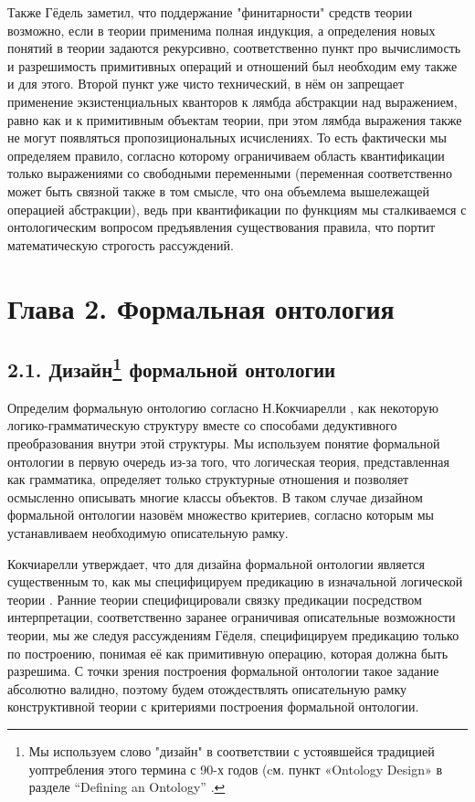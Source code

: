 \documentclass[14pt]{extarticle}
\begin{document}
	Также Гёдель заметил, что поддержание "финитарности" средств теории возможно, если в теории применима полная индукция, а определения новых понятий в теории задаются рекурсивно, соответственно пункт про вычислимость и разрешимость примитивных операций и отношений был необходим ему также и для этого. Второй пункт уже чисто технический, в нём он запрещает применение экзистенциальных кванторов к лямбда абстракции над выражением, равно как и к примитивным объектам теории, при этом лямбда выражения также не могут появляться  пропозициональных исчислениях.  То есть фактически мы определяем правило, согласно которому ограничиваем область квантификации только выражениями со свободными переменными (переменная соответственно может быть связной также в том смысле, что она объемлема вышележащей операцией абстракции), ведь при квантификации по функциям мы сталкиваемся с онтологическим вопросом предъявления существования правила, что портит математическую строгость рассуждений. 
	\newpage
	\section*{Глава 2. Формальная онтология}
	\subsection*{2.1. Дизайн\footnote{Мы используем слово "дизайн" в соответствии с устоявшейся традицией уоптребления этого термина с 90-х годов (cм. пункт «Ontology Design» в разделе “Defining an Ontology” \cite[5–7]{gruber1993translation}.} формальной онтологии}
	
	Определим формальную онтологию согласно Н.Кокчиарелли \cite{Cocchiarella1996}, как некоторую логико-грамматическую структуру вместе со способами дедуктивного преобразования внутри этой структуры. Мы используем понятие формальной онтологии в первую очередь из-за того, что логическая теория, представленная как грамматика, определяет только структурные отношения и позволяет осмысленно описывать многие классы объектов. В таком случае дизайном формальной онтологии назовём множество критериев, согласно которым мы устанавливаем необходимую описательную рамку.
	
	Кокчиарелли утверждает, что для дизайна формальной онтологии является существенным то, как мы специфицируем предикацию в изначальной логической теории \cite[28]{Cocchiarella1996}. Ранние теории специфицировали связку предикации посредством интерпретации, соответственно заранее ограничивая описательные возможности теории, мы же следуя рассуждениям Гёделя, специфицируем предикацию только по построению, понимая её как примитивную операцию, которая должна быть разрешима. С точки зрения построения формальной онтологии такое задание абсолютно валидно, поэтому будем отождествлять описательную рамку конструктивной теории с критериями построения формальной онтологии.
	
\end{document}

